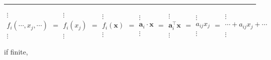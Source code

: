 \documentclass[
]{book}
\theoremstyle{definition}
\theoremstyle{definition}
\theoremstyle{definition}
\theoremstyle{definition}
\theoremstyle{remark}
\begin{document}
\begin{center}\rule{0.5\linewidth}{0.5pt}\end{center}

\[
\begin{array}{c}
\vdots\\
f_{{\scriptscriptstyle i}}\left(\cdots,x_{{\scriptscriptstyle j}},\cdots\right)\\
\vdots
\end{array}=\begin{array}{c}
\vdots\\
f_{{\scriptscriptstyle i}}\left(x_{{\scriptscriptstyle j}}\right)\\
\vdots
\end{array}=\begin{array}{c}
\vdots\\
f_{{\scriptscriptstyle i}}\left(\boldsymbol{x}\right)\\
\vdots
\end{array}=\begin{array}{c}
\vdots\\
\boldsymbol{a}_{{\scriptscriptstyle i}}\cdot\boldsymbol{x}\\
\vdots
\end{array}=\begin{array}{c}
\vdots\\
\boldsymbol{a}_{{\scriptscriptstyle i}}^{\intercal}\boldsymbol{x}\\
\vdots
\end{array}=\begin{array}{c}
\vdots\\
a_{{\scriptscriptstyle ij}}x_{{\scriptscriptstyle j}}\\
\vdots
\end{array}=\begin{array}{c}
\vdots\\
\cdots+a_{{\scriptscriptstyle ij}}x_{{\scriptscriptstyle j}}+\cdots\\
\vdots
\end{array}
\]

if finite,
\end{document}
